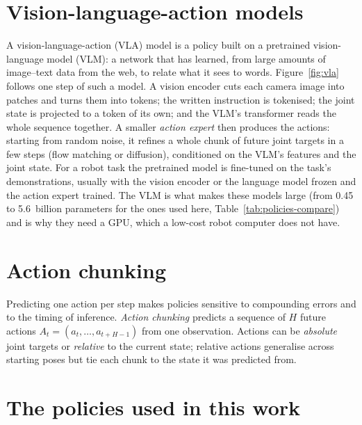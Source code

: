 \section{Vision-language-action models}\label{sec:bg-vla}
A vision-language-action (VLA) model is a policy built on a pretrained vision-language model (VLM): a network that has
learned, from large amounts of image--text data from the web, to relate what it sees to words. Figure~\ref{fig:vla}
follows one step of such a model. A vision encoder cuts each camera image into patches and turns them into tokens; the
written instruction is tokenised; the joint state is projected to a token of its own; and the VLM's transformer reads
the whole sequence together. A smaller \emph{action expert} then produces the actions: starting from random noise, it
refines a whole chunk of future joint targets in a few steps (flow matching or diffusion), conditioned on the VLM's
features and the joint state. For a robot task the pretrained model is fine-tuned on the task's demonstrations,
usually with the vision encoder or the language model frozen and the action expert trained. The VLM is what makes
these models large (from 0.45 to 5.6~billion parameters for the ones used here, Table~\ref{tab:policies-compare}) and is
why they need a GPU, which a low-cost robot computer does not have.


\section{Action chunking}

Predicting one action per step makes policies sensitive to compounding errors and to the timing of inference.
\emph{Action chunking} predicts a sequence of $H$ future actions $A_t=(a_t,\dots,a_{t+H-1})$ from one observation.
Actions can be \emph{absolute} joint targets or \emph{relative} to the current state; relative actions generalise
across starting poses but tie each chunk to the state it was predicted from.

\section{The policies used in this work}\label{sec:bg-policies}


